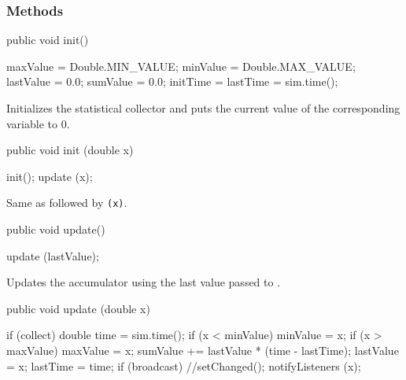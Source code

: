 \subsubsection* {Methods}
\begin{code}

   public void init() \begin{hide} {
       maxValue = Double.MIN_VALUE;
       minValue = Double.MAX_VALUE;
       lastValue = 0.0;
       sumValue = 0.0;
       initTime = lastTime = sim.time();
   } \end{hide}
\end{code}
  \begin{tabb}  Initializes the statistical collector and puts the current
   value of the corresponding variable to 0.
 \end{tabb}
\begin{code}

   public void init (double x) \begin{hide} {
       init();  update (x);
   } \end{hide}
\end{code}
  \begin{tabb}  Same as  followed by \texttt{(x)}.
 \end{tabb}
\begin{htmlonly}
\end{htmlonly}
\begin{code}

   public void update()\begin{hide} {
      update (lastValue);
   }\end{hide}
\end{code}
\begin{tabb}  Updates the accumulator using the last value passed
  to .
\end{tabb}
\begin{code}

   public void update (double x) \begin{hide} {
      if (collect) {
         double time = sim.time();
         if (x < minValue) minValue = x;
         if (x > maxValue) maxValue = x;
         sumValue += lastValue * (time - lastTime);
         lastValue = x;
         lastTime = time;
      }
      if (broadcast) {
         //setChanged();
         notifyListeners (x);
      }
   }\end{hide}
\end{code}
